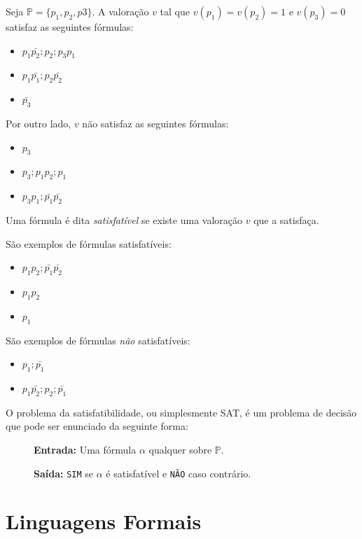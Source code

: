 \begin{example}
Seja $\mathbb{P} = \{p_1, p_2, p3\}$. A valoração $v$ tal que $v(p_1) = v(p_2) = 1$ e $v(p_3) = 0$ satisfaz as seguintes fórmulas:

\begin{itemize}
\item[] $p_1\bar{p_2};p_2;p_3p_1$
\item[] $p_1\bar{p_1};p_2\bar{p_2}$
\item[] $\bar{p_3}$
\end{itemize}

Por outro lado, $v$ não satisfaz as seguintes fórmulas:
\begin{itemize}
\item[] $p_3$
\item[] $p_3;p_1p_2;p_1$
\item[] $p_3p_1;\bar{p_1}\bar{p_2}$
\end{itemize}
\end{example}

Uma fórmula é dita {\em satisfatível} se existe uma valoração $v$ que a satisfaça.


\begin{example}
  São exemplos de fórmulas satisfatíveis:
\begin{itemize}
\item[] $p_1p_2;\bar{p_1}\bar{p_2}$
\item[] $p_1p_2$
\item[] $p_1$
\end{itemize}

São exemplos de fórmulas {\em não} satisfatíveis:
\begin{itemize}
\item[] $p_1;\bar{p_1}$
\item[] $p_1\bar{p_2};p_2;\bar{p_1}$
\end{itemize}
\end{example}


O problema da satisfatibilidade, ou simplesmente SAT, é um problema de decisão que pode ser enunciado da seguinte forma:

  \begin{description}
  \item[] {\bf Entrada:} Uma fórmula $\alpha$ qualquer sobre $\mathbb{P}$.
  \item[] {\bf Saída:} {\tt SIM} se $\alpha$ é satisfatível e {\tt NÃO} caso contrário.
  \end{description}

\section{Linguagens Formais}
\label{sec:linguagens}

